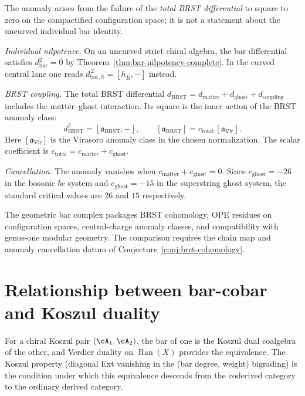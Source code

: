 \begin{remark}
The anomaly arises from the failure of the \emph{total BRST
differential} to square to zero on the compactified configuration
space; it is not a statement about the uncurved individual bar
identity.

\emph{Individual nilpotence.} On an uncurved strict chiral
algebra, the bar differential satisfies $d_{\text{bar}}^2 = 0$ by
Theorem~\ref{thm:bar-nilpotency-complete}. In the curved central lane
one reads $d_{\text{bar},h}^{\,2}=[h_{\bar B},-]$ instead.

\emph{BRST coupling.} The total BRST differential
$d_{\text{BRST}} = d_{\text{matter}} + d_{\text{ghost}} +
d_{\text{coupling}}$ includes the matter--ghost interaction. Its square
is the inner action of the BRST anomaly class:
\[
d_{\text{BRST}}^2=[\mathfrak a_{\mathrm{BRST}},-],
\qquad
[\mathfrak a_{\mathrm{BRST}}]
=c_{\mathrm{total}}\,[\mathfrak a_{\mathrm{Vir}}].
\]
Here $[\mathfrak a_{\mathrm{Vir}}]$ is the Virasoro anomaly class in the
chosen normalization. The scalar coefficient is
$c_{\mathrm{total}}=c_{\mathrm{matter}}+c_{\mathrm{ghost}}$.

\emph{Cancellation.} The anomaly vanishes when
$c_{\text{matter}} + c_{\text{ghost}} = 0$. Since
$c_{\text{ghost}} = -26$ in the bosonic $bc$ system and
$c_{\text{ghost}} = -15$ in the superstring ghost system, the standard
critical values are $26$ and $15$ respectively.
\end{remark}

\begin{remark}
The geometric bar complex packages BRST cohomology, OPE residues on
configuration spaces, central-charge anomaly classes, and compatibility
with genus-one modular geometry. The comparison requires the chain map
and anomaly cancellation datum of Conjecture~\ref{conj:brst-cohomology}.
\end{remark}

\section{Relationship between bar-cobar and Koszul duality}

For a chiral Koszul pair $(\cA_1, \cA_2)$, the bar of one is the
Koszul dual coalgebra of the other, and Verdier duality on
$\operatorname{Ran}(X)$ provides the equivalence. The Koszul
property (diagonal Ext vanishing in the (bar degree, weight)
bigrading) is the condition under which this equivalence descends
from the coderived category to the ordinary derived category.

